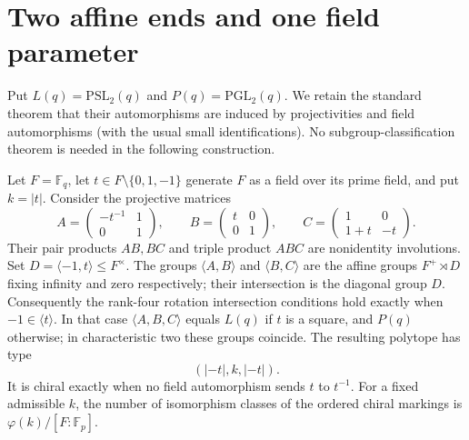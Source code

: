 \section{Two affine ends and one field parameter}
Put $L(q)=\mathrm{PSL}_2(q)$ and $P(q)=\mathrm{PGL}_2(q)$.
We retain the standard theorem that their automorphisms are induced by
projectivities and field automorphisms (with the usual small identifications).
No subgroup-classification theorem is needed in the following construction.
\begin{theorem}\label{E.PointedTriples}
Let $F=\mathbb F_q$, let $t\in F\setminus\{0,1,-1\}$ generate $F$ as a
field over its prime field, and put $k=|t|$. Consider the projective matrices
\[
 A=\begin{pmatrix}-t^{-1}&1\\0&1\end{pmatrix},\qquad
 B=\begin{pmatrix}t&0\\0&1\end{pmatrix},\qquad
 C=\begin{pmatrix}1&0\\1+t&-t\end{pmatrix}.
\]
Their pair products $AB,BC$ and triple product $ABC$ are nonidentity
involutions. Set $D=\langle-1,t\rangle\le F^\times$.
The groups $\langle A,B\rangle$ and $\langle B,C\rangle$ are the affine
groups $F^+\rtimes D$ fixing infinity and zero respectively; their
intersection is the diagonal group $D$. Consequently the rank-four
rotation intersection conditions hold exactly when $-1\in\langle t\rangle$.
In that case $\langle A,B,C\rangle$ equals $L(q)$ if $t$ is a square,
and $P(q)$ otherwise; in characteristic two these groups coincide.
The resulting polytope has type
\[
 (|{-t}|,k,|{-t}|).
\]
It is chiral exactly when no field automorphism sends $t$ to $t^{-1}$.
For a fixed admissible $k$, the number of isomorphism classes of the
ordered chiral markings is $\varphi(k)/[F:\mathbb F_p]$.
\end{theorem}

